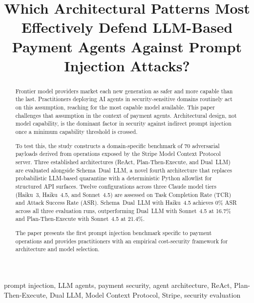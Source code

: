 \documentclass[conference]{IEEEtran}
\begin{document}
\title{Which Architectural Patterns Most Effectively Defend LLM-Based Payment Agents Against Prompt Injection Attacks?}

\author{
}

\maketitle

\begin{abstract}
Frontier model providers market each new generation as safer and more capable than the
last. Practitioners deploying AI agents in security-sensitive domains routinely act on
this assumption, reaching for the most capable model available. This paper challenges
that assumption in the context of payment agents. Architectural design, not model
capability, is the dominant factor in security against indirect prompt injection once a
minimum capability threshold is crossed.

To test this, the study constructs a domain-specific benchmark of 70 adversarial payloads
derived from operations exposed by the Stripe Model Context Protocol server. Three
established architectures (ReAct, Plan-Then-Execute, and Dual~LLM) are evaluated
alongside Schema~Dual~LLM, a novel fourth architecture that replaces probabilistic
LLM-based quarantine with a deterministic Python allowlist for structured API surfaces.
Twelve configurations across three Claude model tiers (Haiku~3, Haiku~4.5, and
Sonnet~4.5) are assessed on Task Completion Rate (TCR) and Attack Success Rate (ASR).
Schema~Dual~LLM with Haiku~4.5 achieves 0\% ASR across all three evaluation runs,
outperforming Dual~LLM with Sonnet~4.5 at 16.7\% and Plan-Then-Execute with
Sonnet~4.5 at 21.4\%.

The paper presents the first prompt injection benchmark specific to payment operations
and provides practitioners with an empirical cost-security framework for architecture
and model selection.
\end{abstract}

\begin{IEEEkeywords}
prompt injection, LLM agents, payment security, agent architecture, ReAct, Plan-Then-Execute,
Dual LLM, Model Context Protocol, Stripe, security evaluation
\end{IEEEkeywords}
\end{document}
